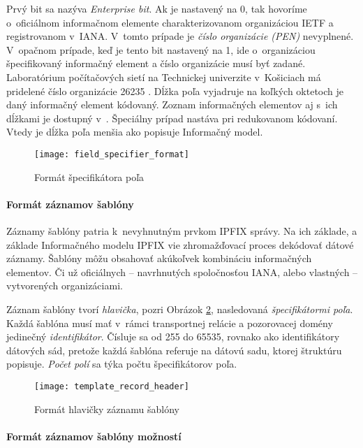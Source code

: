 Prvý bit sa nazýva \emph{Enterprise bit}.
Ak je nastavený na 0, tak hovoríme o~oficiálnom informačnom elemente charakterizovanom organizáciou IETF a 
registrovanom v~IANA. 
V~tomto prípade je \emph{číslo organizácie (PEN)} nevyplnené. V~opačnom prípade, 
keď je tento bit nastavený na 1, ide o~organizáciou špecifikovaný informačný element a číslo organizácie
musí byť zadané. Laboratórium počítačových sietí na Technickej univerzite v~Košiciach má pridelené číslo 
organizácie 26235 \citep{pen}.
Dĺžka poľa vyjadruje na koľkých oktetoch je daný informačný element kódovaný. 
Zoznam informačných elementov aj s~ich dĺžkami je dostupný v~\citep{rfc5102}.
Špeciálny prípad nastáva pri redukovanom kódovaní. Vtedy je dĺžka poľa menšia ako popisuje 
Informačný model. 
 
\begin{figure}[ht!]
\centering
\texttt{[image: field\_specifier\_format]}
\caption{Formát špecifikátora poľa}\label{o:field_specifier_format}
\end{figure}



\paragraph{Formát záznamov šablóny}

Záznamy šablóny patria k~nevyhnutným prvkom IPFIX správy. Na ich základe, a základe Informačného modelu
IPFIX \citep{rfc5102} vie zhromažďovací proces dekódovať dátové záznamy.
Šablóny môžu obsahovať akúkoľvek kombináciu informačných elementov. Či už oficiálnych -- navrhnutých 
spoločnosťou IANA, alebo vlastných -- vytvorených organizáciami.

Záznam šablóny tvorí \emph{hlavička}, pozri Obrázok \ref{o:template_record_header}, nasledovaná 
\emph{špecifikátormi poľa}. 
Každá šablóna musí mať v~rámci transportnej relácie a pozorovacej domény jedinečný \emph{identifikátor}. 
Čísluje sa od 255 do 65535, rovnako ako identifikátory dátových sád, pretože každá šablóna referuje 
na dátovú sadu, ktorej štruktúru popisuje. \emph{Počet polí} sa týka počtu 
špecifikátorov poľa.

\begin{figure}[ht!]
\centering
\texttt{[image: template\_record\_header]}
\caption{Formát hlavičky záznamu šablóny}\label{o:template_record_header}
\end{figure}



\paragraph{Formát záznamov šablóny možností}


